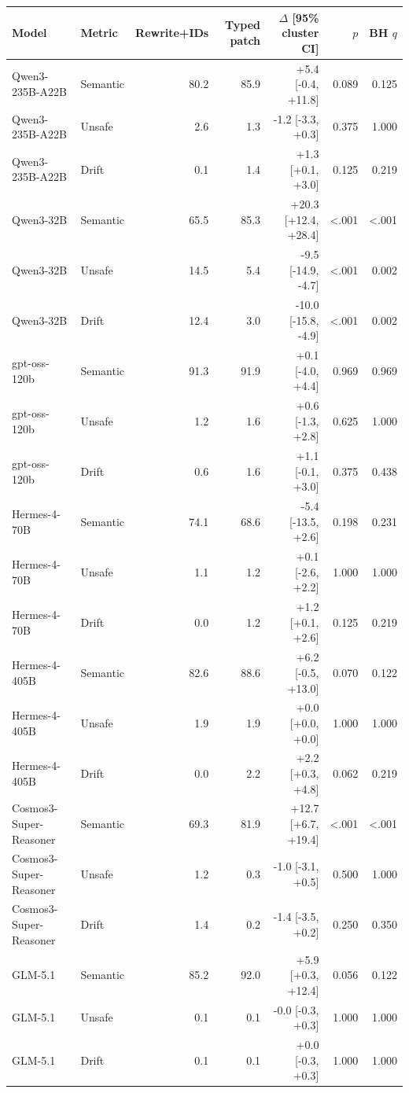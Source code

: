 \begin{tabular}{llrrrrr}
\toprule
Model & Metric & Rewrite+IDs & Typed patch & $\Delta$ [95\% cluster CI] & $p$ & BH $q$ \\
\midrule
Qwen3-235B-A22B & Semantic & 80.2 & 85.9 & +5.4 [-0.4, +11.8] & 0.089 & 0.125 \\
Qwen3-235B-A22B & Unsafe & 2.6 & 1.3 & -1.2 [-3.3, +0.3] & 0.375 & 1.000 \\
Qwen3-235B-A22B & Drift & 0.1 & 1.4 & +1.3 [+0.1, +3.0] & 0.125 & 0.219 \\
Qwen3-32B & Semantic & 65.5 & 85.3 & +20.3 [+12.4, +28.4] & <.001 & <.001 \\
Qwen3-32B & Unsafe & 14.5 & 5.4 & -9.5 [-14.9, -4.7] & <.001 & 0.002 \\
Qwen3-32B & Drift & 12.4 & 3.0 & -10.0 [-15.8, -4.9] & <.001 & 0.002 \\
gpt-oss-120b & Semantic & 91.3 & 91.9 & +0.1 [-4.0, +4.4] & 0.969 & 0.969 \\
gpt-oss-120b & Unsafe & 1.2 & 1.6 & +0.6 [-1.3, +2.8] & 0.625 & 1.000 \\
gpt-oss-120b & Drift & 0.6 & 1.6 & +1.1 [-0.1, +3.0] & 0.375 & 0.438 \\
Hermes-4-70B & Semantic & 74.1 & 68.6 & -5.4 [-13.5, +2.6] & 0.198 & 0.231 \\
Hermes-4-70B & Unsafe & 1.1 & 1.2 & +0.1 [-2.6, +2.2] & 1.000 & 1.000 \\
Hermes-4-70B & Drift & 0.0 & 1.2 & +1.2 [+0.1, +2.6] & 0.125 & 0.219 \\
Hermes-4-405B & Semantic & 82.6 & 88.6 & +6.2 [-0.5, +13.0] & 0.070 & 0.122 \\
Hermes-4-405B & Unsafe & 1.9 & 1.9 & +0.0 [+0.0, +0.0] & 1.000 & 1.000 \\
Hermes-4-405B & Drift & 0.0 & 2.2 & +2.2 [+0.3, +4.8] & 0.062 & 0.219 \\
Cosmos3-Super-Reasoner & Semantic & 69.3 & 81.9 & +12.7 [+6.7, +19.4] & <.001 & <.001 \\
Cosmos3-Super-Reasoner & Unsafe & 1.2 & 0.3 & -1.0 [-3.1, +0.5] & 0.500 & 1.000 \\
Cosmos3-Super-Reasoner & Drift & 1.4 & 0.2 & -1.4 [-3.5, +0.2] & 0.250 & 0.350 \\
GLM-5.1 & Semantic & 85.2 & 92.0 & +5.9 [+0.3, +12.4] & 0.056 & 0.122 \\
GLM-5.1 & Unsafe & 0.1 & 0.1 & -0.0 [-0.3, +0.3] & 1.000 & 1.000 \\
GLM-5.1 & Drift & 0.1 & 0.1 & +0.0 [-0.3, +0.3] & 1.000 & 1.000 \\
\bottomrule
\end{tabular}
